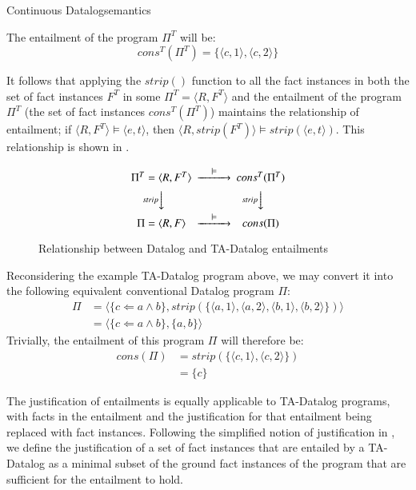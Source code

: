 \begin{nestedsection}{Continuous Datalog}{semantics}
\begin{definition}
The entailment of the program $\Pi^T$ will be:
\[cons^T(\Pi^T) = \{\langle c, 1 \rangle, \langle c, 2 \rangle\}\]

It follows that applying the ${strip()}$ function to all the fact
instances in both the set of fact instances $F^T$ in some ${\Pi^T =
  \langle R, F^T \rangle}$ and the entailment of the program $\Pi^T$
(the set of fact instances $cons^T(\Pi^T)$) maintains the relationship
of entailment; if $\langle R, F^T\rangle \models \langle e, t
\rangle$, then $\langle R, strip(F^T) \rangle \models strip(\langle e,
t \rangle)$. This relationship is shown in .

\begin{figure}[htb]
  \[
  \begin{CD}
\Pi^T = \langle R, F^T \rangle @>\models>> cons^T(\Pi^T) \\
@V{strip}VV @V{strip}VV \\
\Pi = \langle R, F \rangle @>\models>> cons(\Pi)
  \end{CD}
  \]
\caption{Relationship between Datalog and TA-Datalog entailments}
\end{figure}

Reconsidering the example TA-Datalog program above, we may convert it
into the following equivalent conventional Datalog program $\Pi$:
\begin{align*}
\Pi &= \langle \{ c \Leftarrow a \land b \}, strip(\{ \langle a, 1 \rangle, \langle a, 2 \rangle, \langle b, 1 \rangle, \langle b, 2 \rangle \}) \rangle \\
    &= \langle \{ c \Leftarrow a \land b \}, \{ a, b \} \rangle
\end{align*}
Trivially, the entailment of this program $\Pi$ will therefore be:
\begin{align*}
cons(\Pi) &= strip(\{\langle c, 1 \rangle, \langle c, 2 \rangle\}) \\
 &= \{ c \}  
\end{align*}
\end{definition}

\begin{definition}

The justification of entailments is equally applicable to TA-Datalog
programs, with facts in the entailment and the justification for that
entailment being replaced with fact instances.  Following the
simplified notion of justification in , we define the justification of a set of fact
instances that are entailed by a TA-Datalog as a minimal subset of
the ground fact instances of the program that are sufficient for
the entailment to hold.


\end{definition}
\end{nestedsection}
